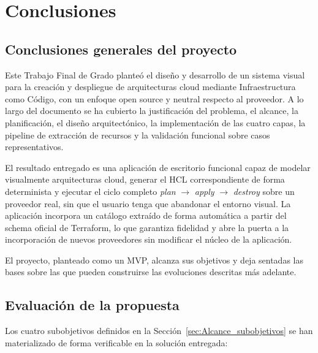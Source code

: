 \documentclass{article}
\begin{document}

    \newpage
    \section{Conclusiones}
    {
        \setlength{\parskip}{1em}
        \label{sec:conclusiones}

        \subsection{Conclusiones generales del proyecto}
        \justify
        Este Trabajo Final de Grado planteó el diseño y desarrollo de un sistema
        visual para la creación y despliegue de arquitecturas cloud mediante
        Infraestructura como Código, con un enfoque open source y neutral
        respecto al proveedor. A lo largo del documento se ha cubierto la
        justificación del problema, el alcance, la planificación, el diseño
        arquitectónico, la implementación de las cuatro capas, la pipeline de
        extracción de recursos y la validación funcional sobre casos
        representativos.

        \justify
        El resultado entregado es una aplicación de escritorio funcional capaz de
        modelar visualmente arquitecturas cloud, generar el HCL correspondiente
        de forma determinista y ejecutar el ciclo completo
        \textit{plan} $\rightarrow$ \textit{apply} $\rightarrow$ \textit{destroy}
        sobre un proveedor real, sin que el usuario tenga que abandonar el
        entorno visual. La aplicación incorpora un catálogo extraído de forma
        automática a partir del schema oficial de Terraform, lo que garantiza
        fidelidad y abre la puerta a la incorporación de nuevos proveedores sin
        modificar el núcleo de la aplicación.

        \justify
        El proyecto, planteado como un MVP, alcanza sus objetivos y deja
        sentadas las bases sobre las que pueden
        construirse las evoluciones descritas más adelante.

        \subsection{Evaluación de la propuesta}
        \justify
        Los cuatro subobjetivos definidos en la
        Sección~\ref{sec:Alcance_subobjetivos} se han materializado de forma
        verificable en la solución entregada:

}
\end{document}
